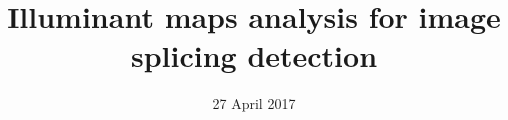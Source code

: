 \documentclass{beamer}
\author{}
\title{\huge Illuminant maps analysis for image splicing detection}
\date{27 April 2017}
\begin{document}
\titlepageframe



\end{document}
